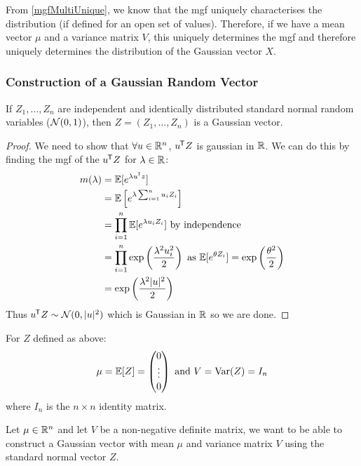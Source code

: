 \documentclass[../main.tex]{subfiles}
\begin{document}
From \cref{mgfMultiUnique}, we know that the mgf uniquely characterises the distribution (if defined for an open set of values).
Therefore, if we have a mean vector $\mu$ and a variance matrix $V$, this uniquely determines the mgf and therefore uniquely determines the distribution of the Gaussian vector $X$.
\subsubsection{Construction of a Gaussian Random Vector}
\begin{lemma}
  If $Z_1, \ldots, Z_n$ are independent and identically distributed standard normal random variables ($\operatorname{\mathcal{N}}(0, 1)$), then $Z = (Z_1, \ldots, Z_n)$ is a Gaussian vector. \label{standardGaussian}
\end{lemma}
\begin{proof}
  We need to show that $\forall u \in \mathbb{R}^{n}$, $u^{{\mkern-1.5mu\mathsf{T}}}Z$ is gaussian in $\mathbb{R}$.
  We can do this by finding the mgf of the $u^{{\mkern-1.5mu\mathsf{T}}} Z$ for $\lambda \in \mathbb{R}$:
  \begin{align*}
    m(\lambda) &= \mathbb{E}[e^{\lambda u^{{\mkern-1.5mu\mathsf{T}}}z}] \\
               &= \mathbb{E}\left[e^{\lambda \sum_{i = 1}^{n} u_i Z_i}\right] \\
               &= \prod_{i = 1}^{n} \mathbb{E}[e^{\lambda u_i Z_i}] \text{ by independence} \\
               &= \prod_{i = 1}^{n} \exp\left(\frac{\lambda^2 u^2_i}{2}\right) \text{ as } \mathbb{E}[e^{\theta Z_i}] = \exp\left(\frac{\theta^2}{2}\right) \\
               &= \exp\left(\frac{\lambda^2 |u|^2}{2}\right)
  \end{align*}
  Thus $u^{{\mkern-1.5mu\mathsf{T}}} Z \sim \operatorname{\mathcal{N}}(0, |u|^2)$ which is Gaussian in $\mathbb{R}$ so we are done.
\end{proof}
\begin{remark}
  For $Z$ defined as above:
  \begin{equation}
    \mu = \mathbb{E}[Z] = \begin{pmatrix}
    0 \\
    \vdots \\
    0 \\
    \end{pmatrix} \text{ and } V = \operatorname{Var}(Z) = I_n \label{standardGaussianExpVar}
  \end{equation}
  where $I_n$ is the $n \times n$ identity matrix.
\end{remark}
Let $\mu \in \mathbb{R}^{n}$ and let $V$ be a non-negative definite matrix, we want to be able to construct a Gaussian vector with mean $\mu$ and variance matrix $V$ using the standard normal vector $Z$.
\end{document}
